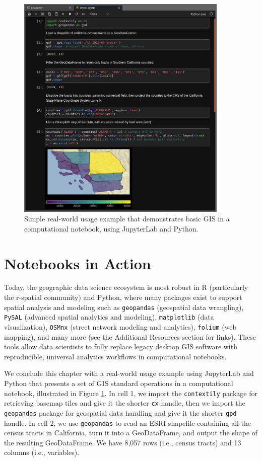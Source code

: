 \documentclass[11pt,letterpaper]{article}
\begin{document}
\begin{figure}[!tb]
	\centering
	\includegraphics[width=0.9\textwidth]{code-demo.png}
	\caption{Simple real-world usage example that demonstrates basic GIS in a computational notebook, using JupyterLab and Python.}
	\label{fig:code_demo}
\end{figure}

\section{Notebooks in Action}

Today, the geographic data science ecosystem is most robust in R (particularly the r-spatial community) and Python, where many packages exist to support spatial analysis and modeling such as \texttt{geopandas} (geospatial data wrangling), \texttt{PySAL} (advanced spatial analytics and modeling), \texttt{matplotlib} (data visualization), \texttt{OSMnx}  (street network modeling and analytics), \texttt{folium} (web mapping), and many more (see the Additional Resources section for links). These tools allow data scientists to fully replace legacy desktop GIS software with reproducible, universal analytics workflows in computational notebooks.

We conclude this chapter with a real-world usage example using JupyterLab and Python that presents a set of GIS standard operations in a computational notebook, illustrated in Figure \ref{fig:code_demo}. In cell 1, we import the \texttt{contextily} package for retrieving basemap tiles and give it the shorter \texttt{cx} handle, then we import the \texttt{geopandas} package for geospatial data handling and give it the shorter \texttt{gpd} handle. In cell 2, we use \texttt{geopandas} to read an ESRI shapefile containing all the census tracts in California, turn it into a GeoDataFrame, and output the shape of the resulting GeoDataFrame. We have 8,057 rows (i.e., census tracts) and 13 columns (i.e., variables).
\end{document}

